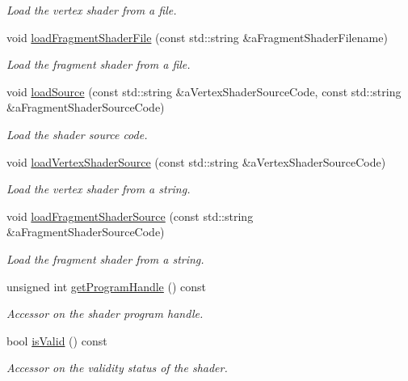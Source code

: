 \begin{DoxyCompactItemize}
\begin{DoxyCompactList}\small\item\em Load the vertex shader from a file. \end{DoxyCompactList}\item 
void \hyperlink{class_graphics_1_1_shader_ad010d612d1342029340df373d0f72927}{loadFragmentShaderFile} (const std::string \&aFragmentShaderFilename)
\begin{DoxyCompactList}\small\item\em Load the fragment shader from a file. \end{DoxyCompactList}\item 
void \hyperlink{class_graphics_1_1_shader_a6cc2300317fff3297c160e5362592110}{loadSource} (const std::string \&aVertexShaderSourceCode, const std::string \&aFragmentShaderSourceCode)
\begin{DoxyCompactList}\small\item\em Load the shader source code. \end{DoxyCompactList}\item 
void \hyperlink{class_graphics_1_1_shader_add407f9caed153f212d7505db84a8548}{loadVertexShaderSource} (const std::string \&aVertexShaderSourceCode)
\begin{DoxyCompactList}\small\item\em Load the vertex shader from a string. \end{DoxyCompactList}\item 
void \hyperlink{class_graphics_1_1_shader_aa33a3e33b12469b576eca345997d7462}{loadFragmentShaderSource} (const std::string \&aFragmentShaderSourceCode)
\begin{DoxyCompactList}\small\item\em Load the fragment shader from a string. \end{DoxyCompactList}\item 
unsigned int \hyperlink{class_graphics_1_1_shader_ab5b6c7831e9365b1020d0c30122b9213}{getProgramHandle} () const 
\begin{DoxyCompactList}\small\item\em Accessor on the shader program handle. \end{DoxyCompactList}\item 
bool \hyperlink{class_graphics_1_1_shader_a8e649b3a4b9dc0361f3090898b79de36}{isValid} () const 
\begin{DoxyCompactList}\small\item\em Accessor on the validity status of the shader. \end{DoxyCompactList}\end{DoxyCompactItemize}
